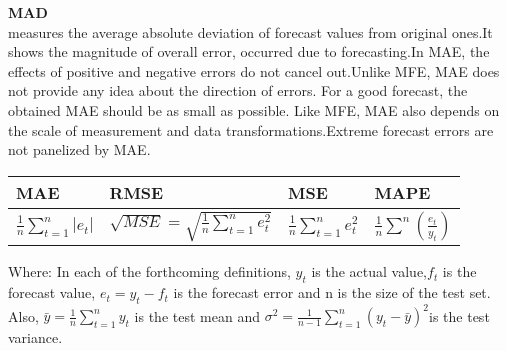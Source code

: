\textbf{MAD}\\
measures the average absolute deviation of forecast values from   original ones.It shows the magnitude of overall error, occurred due to forecasting.In MAE, the effects of positive and negative errors do not cancel out.Unlike MFE, MAE does not provide any idea about the direction of  errors. For a good forecast, the obtained MAE should be as small as possible. Like MFE, MAE also depends on the scale of measurement and data   transformations.Extreme forecast errors are not panelized by MAE.\\
	\begin{table}[]
		\begin{tabularx}{\textwidth}{@{}llll@{}}
			\toprule \hline
			MAE	&  RMSE   &  MSE   &  MAPE  \\ \midrule
			\hline
			$\displaystyle  \frac{1}{n}\sum_{t=1}^{n}|e_{t}|$	& $\displaystyle  \sqrt{MSE} = \sqrt {\frac{1}{n}\sum_{t=1}^{n}e^{2}_{t}}$    & $\displaystyle  \frac{1}{n}\sum_{t=1}^{n}e^{2}_{t}$    & $\displaystyle  \frac{1}{n}\sum^{n}\left(\frac{e_{t}}{y_{t}}\right)$   \\ \bottomrule
			
		\end{tabularx}
	\end{table}
Where: In each of the forthcoming definitions, $y_{t }$ is the actual value,$f_{t}$ is the forecast value, $e_{t} = y_{t} - f_{t}$ is the forecast error and n is the size of the test set. Also, $\displaystyle \bar{y} = \frac{1}{n}\sum_{t=1}^{n}y_{t}$ is the test mean and $\displaystyle \sigma^{2} = \frac{1}{n-1}\sum_{t=1}^{n}(y_{t}-\bar{y})^{2}$is the test variance.

